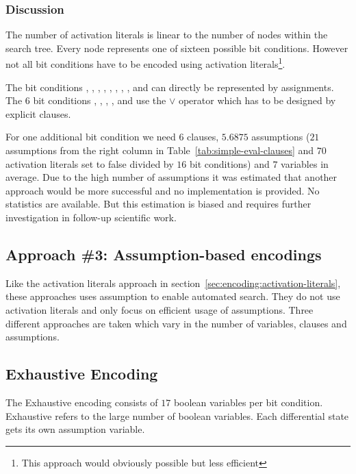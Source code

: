 \subsubsection{Discussion}
\label{sec:activation-literals-discussion}
%
The number of activation literals is linear to the number of nodes within the search tree. Every node represents one of sixteen possible bit conditions. However not all bit conditions have to be encoded using activation literals\footnote{This approach would obviously possible but less efficient}.

The bit conditions \bc{\#}, , , , , , , ,  and  can directly be represented by assignments. The $6$ bit conditions , , \bc{-}, ,  and  use the $\lor$ operator which has to be designed by explicit clauses.

For one additional bit condition we need $6$ clauses, $5.6875$ assumptions ($21$ assumptions from the right column in Table~\ref{tab:simple-eval-clauses} and $70$ activation literals set to false divided by $16$ bit conditions) and $7$ variables in average. Due to the high number of assumptions it was estimated that another approach would be more successful and no implementation is provided. No statistics are available. But this estimation is biased and requires further investigation in follow-up scientific work.

\subsection{Approach \#3: Assumption-based encodings}
\label{sec:encoding:assumption-encodings}
%
Like the activation literals approach in section~\ref{sec:encoding:activation-literals}, these approaches uses assumption to enable automated search. They do not use activation literals and only focus on efficient usage of assumptions. Three different approaches are taken which vary in the number of variables, clauses and assumptions.

\subsection{Exhaustive Encoding}
\label{sec:encoding:exhaustive}
%
The Exhaustive encoding consists of $17$ boolean variables per bit condition. Exhaustive refers to the large number of boolean variables. Each differential state gets its own assumption variable.

